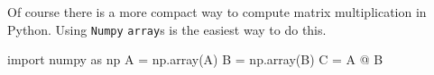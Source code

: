 \documentclass{../../KDHnotes}
\begin{document}
Of course there is a more compact way to compute matrix multiplication in Python. Using \texttt{Numpy} \texttt{array}s is the easiest way to do this.

\begin{python}
import numpy as np
A = np.array(A)
B = np.array(B)
C = A @ B
\end{python}

\nocite{numpy}
\nocite{python37}
\newpage



\end{document}
